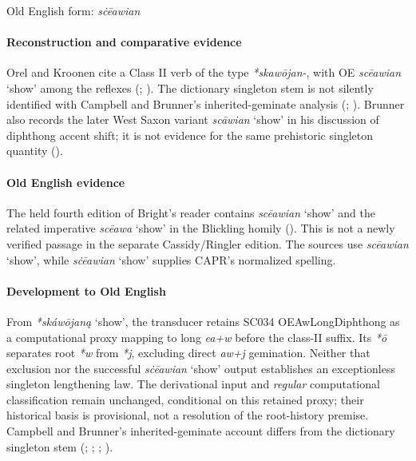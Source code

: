 \documentclass[
  british,
  a4paper,
]{article}
\providecommand{\Recon}[1]{\emph{*#1}}
\begin{document}
Old English form: \emph{sċēawian}

\paragraph{Reconstruction and comparative
evidence}\label{reconstruction-and-comparative-evidence-52}

Orel and Kroonen cite a Class II verb of the type {\emph{*skawōjan-}},
with OE {\emph{scēawian}} `show' among the reflexes
(;
). The dictionary singleton
stem is not silently identified with Campbell and Brunner's
inherited-geminate analysis (; ). Brunner also
records the later West Saxon variant {\emph{scāwian}} `show' in his
discussion of diphthong accent shift; it is not evidence for the same
prehistoric singleton quantity
().

\paragraph{Old English evidence}\label{old-english-evidence-54}

The held fourth edition of Bright's reader contains {\emph{scēawian}}
`show' and the related imperative {\emph{scēawa}} `show' in the
Blickling homily (). This is
not a newly verified passage in the separate Cassidy/Ringler edition.
The sources use {\emph{scēawian}} `show', while {\emph{sċēawian}} `show'
supplies CAPR's normalized spelling.

\paragraph{Development to Old
English}\label{development-to-old-english-53}

From \Recon{skáwōjaną} `show', the transducer retains SC034
OEAwLongDiphthong as a computational proxy mapping to long \emph{ea+w}
before the class-II suffix. Its \emph{*ō} separates root \emph{*w} from
\emph{*j}, excluding direct \emph{aw+j} gemination. Neither that
exclusion nor the successful {\emph{sċēawian}} `show' output establishes
an exceptionless singleton lengthening law. The derivational input and
\emph{regular} computational classification remain unchanged,
conditional on this retained proxy; their historical basis is
provisional, not a resolution of the root-history premise. Campbell and
Brunner's inherited-geminate account differs from the dictionary
singleton stem (;
;
;
).
\end{document}
